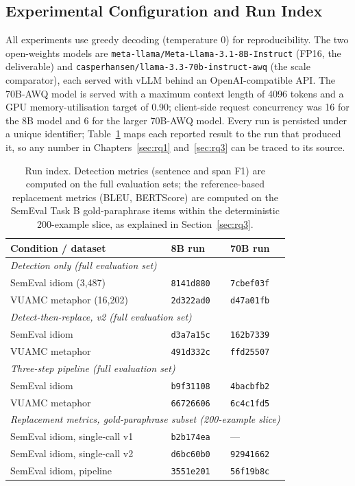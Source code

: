 \subsection{Experimental Configuration and Run Index}
\label{appendix:run-index}

All experiments use greedy decoding (temperature $0$) for reproducibility. The two open-weights models are \texttt{meta-llama/\allowbreak Meta-Llama-3.1-8B-Instruct} (FP16, the deliverable) and \texttt{casperhansen/\allowbreak llama-3.3-70b-instruct-awq} (the scale comparator), each served with vLLM behind an OpenAI-compatible API. The 70B-AWQ model is served with a maximum context length of 4096 tokens and a GPU memory-utilisation target of 0.90; client-side request concurrency was 16 for the 8B model and 6 for the larger 70B-AWQ model. Every run is persisted under a unique identifier; Table~\ref{tab:appendix-runs} maps each reported result to the run that produced it, so any number in Chapters~\ref{sec:rq1} and~\ref{sec:rq3} can be traced to its source.

\begin{table}[h!]
\centering
\small
\begin{tabular}{lll}
\hline
\textbf{Condition / dataset} & \textbf{8B run} & \textbf{70B run} \\
\hline
\multicolumn{3}{l}{\textit{Detection only (full evaluation set)}} \\
\quad SemEval idiom (3{,}487)   & \texttt{8141d880} & \texttt{7cbef03f} \\
\quad VUAMC metaphor (16{,}202) & \texttt{2d322ad0} & \texttt{d47a01fb} \\
\multicolumn{3}{l}{\textit{Detect-then-replace, v2 (full evaluation set)}} \\
\quad SemEval idiom   & \texttt{d3a7a15c} & \texttt{162b7339} \\
\quad VUAMC metaphor  & \texttt{491d332c} & \texttt{ffd25507} \\
\multicolumn{3}{l}{\textit{Three-step pipeline (full evaluation set)}} \\
\quad SemEval idiom   & \texttt{b9f31108} & \texttt{4bacbfb2} \\
\quad VUAMC metaphor  & \texttt{66726606} & \texttt{6c4c1fd5} \\
\multicolumn{3}{l}{\textit{Replacement metrics, gold-paraphrase subset (200-example slice)}} \\
\quad SemEval idiom, single-call v1 & \texttt{b2b174ea} & --- \\
\quad SemEval idiom, single-call v2 & \texttt{d6bc60b0} & \texttt{92941662} \\
\quad SemEval idiom, pipeline       & \texttt{3551e201} & \texttt{56f19b8c} \\
\hline
\end{tabular}
\caption{Run index. Detection metrics (sentence and span F1) are computed on the full evaluation sets; the reference-based replacement metrics (BLEU, BERTScore) are computed on the SemEval Task B gold-paraphrase items within the deterministic 200-example slice, as explained in Section~\ref{sec:rq3}.}
\label{tab:appendix-runs}
\end{table}

